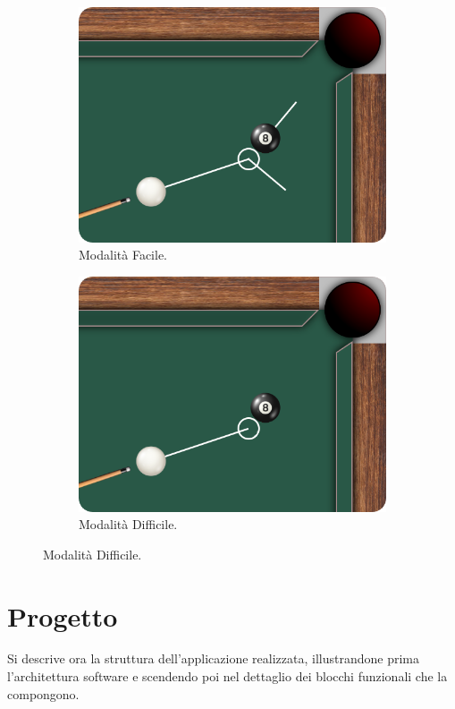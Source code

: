 \documentclass[12pt,a4paper]{report}
\begin{document}
\begin{figure}[h]
\centering
 \begin{subfigure}{.35\textwidth}
    \centering
    \includegraphics[width=.95\linewidth]{Mode1.png}
    \caption{Modalità Facile.}
    \label{fig:easyMode}
 \end{subfigure}
 \begin{subfigure}{.35\textwidth}
    \centering
    \includegraphics[width=.95\linewidth]{Mode2.png}
    \caption{Modalità Difficile.}
    \label{fig:hardMode}
 \end{subfigure}
\end{figure}

\chapter{Progetto}\label{ch:Project} %
Si descrive ora la struttura dell'applicazione realizzata, illustrandone prima l'architettura software e scendendo poi nel dettaglio dei blocchi funzionali che la compongono.
\end{document}
